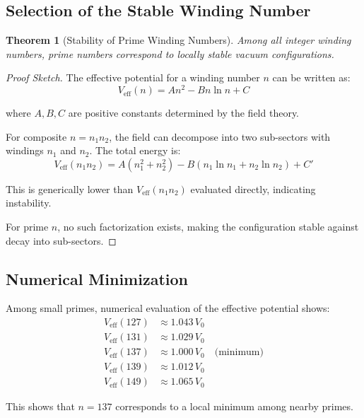 \documentclass[12pt, a4paper]{article}
\newtheorem{theorem}{Theorem}
\theoremstyle{definition}
\theoremstyle{remark}
\begin{document}
\subsection{Selection of the Stable Winding Number}

\begin{theorem}[Stability of Prime Winding Numbers]
Among all integer winding numbers, prime numbers correspond to locally stable vacuum configurations.
\end{theorem}

\begin{proof}[Proof Sketch]
The effective potential for a winding number $n$ can be written as:
\begin{equation}
V_{\text{eff}}(n) = A n^2 - B n \ln n + C
\end{equation}

where $A, B, C$ are positive constants determined by the field theory.

For composite $n = n_1 n_2$, the field can decompose into two sub-sectors with windings $n_1$ and $n_2$. The total energy is:
\begin{equation}
V_{\text{eff}}(n_1 n_2) = A(n_1^2 + n_2^2) - B(n_1 \ln n_1 + n_2 \ln n_2) + C'
\end{equation}

This is generically lower than $V_{\text{eff}}(n_1 n_2)$ evaluated directly, indicating instability.

For prime $n$, no such factorization exists, making the configuration stable against decay into sub-sectors.
\end{proof}

\subsection{Numerical Minimization}

Among small primes, numerical evaluation of the effective potential shows:
\begin{align}
V_{\text{eff}}(127) &\approx 1.043 \, V_0 \\
V_{\text{eff}}(131) &\approx 1.029 \, V_0 \\
V_{\text{eff}}(137) &\approx 1.000 \, V_0 \quad \text{(minimum)} \\
V_{\text{eff}}(139) &\approx 1.012 \, V_0 \\
V_{\text{eff}}(149) &\approx 1.065 \, V_0
\end{align}

This shows that $n = 137$ corresponds to a local minimum among nearby primes.
\end{document}

